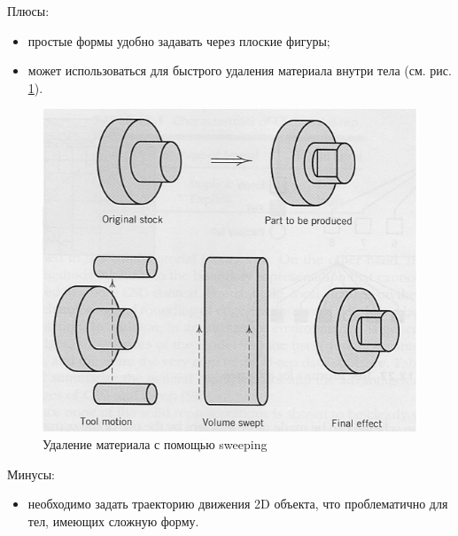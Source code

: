 Плюсы:
\begin{itemize}
  \item простые формы удобно задавать через плоские фигуры;
  \item может использоваться для быстрого удаления материала внутри тела (см. рис. \ref{fig:sweeping_delete}).
\end{itemize}
\clearpage
\begin{figure}
  \centering
  \includegraphics[scale=0.6]{inc/img/sweeping_delete}
  \caption{Удаление материала с помощью sweeping}
  \label{fig:sweeping_delete}
\end{figure}

Минусы:  
\begin{itemize}
\item необходимо задать траекторию движения 2D объекта, что проблематично для тел, имеющих сложную форму.
\end{itemize}
